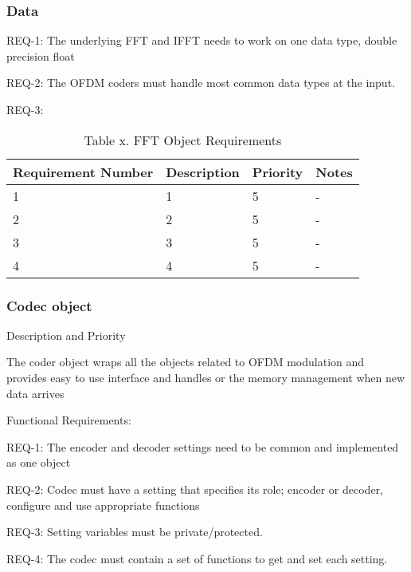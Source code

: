 \documentclass[]{report}
\begin{document}
\subsubsection{Data}

REQ-1: The underlying FFT and IFFT needs to work on one data type, double precision float \par
REQ-2: The OFDM coders must handle most common data types at the input. \par
REQ-3: \par



\begin{table}
	\centering
	
	\begin{tabular}{|l|l|l|l|} 
		\hline
		Requirement Number & Description & Priority & Notes  \\ 
		\hline
		1                  & 1           & 5        & -      \\ 
		\hline
		2                  & 2           & 5        & -      \\ 
		\hline
		3                  & 3           & 5        & -      \\ 
		\hline
		4                  & 4           & 5        & -      \\
		\hline
	\end{tabular}
	\caption{Table x. FFT Object Requirements}
\end{table}


\subsubsection{Codec object}

Description and Priority

The coder object wraps all the objects related to OFDM modulation and provides easy to use interface and handles or the memory management when new data arrives

Functional Requirements:

REQ-1: The encoder and decoder settings need to be common and implemented as one object \par
REQ-2: Codec must have a setting that specifies its role; encoder or decoder, configure and use appropriate functions \par
REQ-3: Setting variables must be private/protected. \par
REQ-4: The codec must contain a set of functions to get and set each setting. \par
\end{document}
